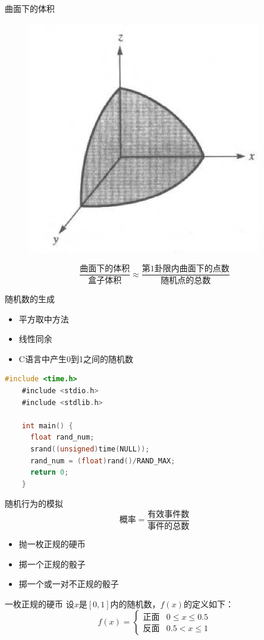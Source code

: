 \documentclass[UTF8]{ctexbeamer}
\begin{document}
\begin{frame}{曲面下的体积}
  \begin{figure}
    \centering
    \includegraphics[width=.3\textwidth{}]{sphere.png}
  \end{figure}

  \[
  \frac{\text{曲面下的体积}}{\text{盒子体积}} \approx \frac{\text{第1卦限内曲面下的点数}}{\text{随机点的总数}}
  \]
\end{frame}

\begin{frame}[fragile]{随机数的生成}
  \begin{itemize}
  \item 平方取中方法
  \item 线性同余
  \item C语言中产生0到1之间的随机数
  \end{itemize}

  \begin{lstlisting}[language=C]
    #include <time.h>
    #include <stdio.h>
    #include <stdlib.h>

    int main() {
      float rand_num;
      srand((unsigned)time(NULL));
      rand_num = (float)rand()/RAND_MAX;
      return 0;
    }
  \end{lstlisting}

\end{frame}

\begin{frame}{随机行为的模拟}
  \[
  \text{概率} = \frac{\text{有效事件数}}{\text{事件的总数}}
  \]

  \begin{itemize}
  \item 抛一枚正规的硬币
  \item 掷一个正规的骰子
  \item 掷一个或一对不正规的骰子
  \end{itemize}
  
\end{frame}

\begin{frame}{一枚正规的硬币}
  设$x$是$[0,1]$内的随机数，$f(x)$的定义如下：
  \[
  f(x) =
  \begin{cases}
    \text{正面} & 0 \le x \le 0.5\\
    \text{反面} & 0.5 < x \le 1
  \end{cases}
  \]
\end{frame}
\end{document}
